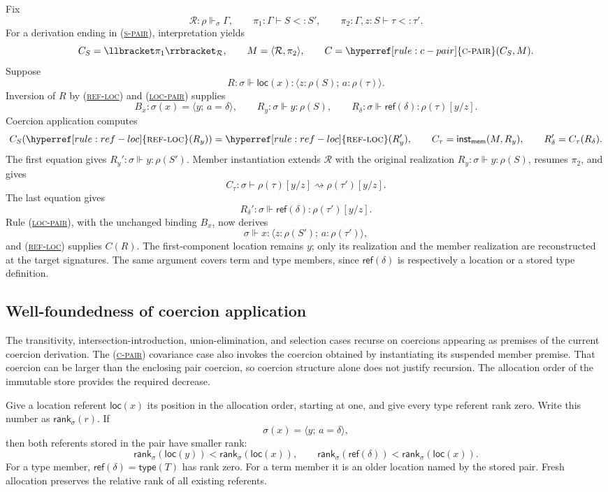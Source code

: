 \documentclass[acmsmall,screen,nonacm]{acmart}
\newcommand{\ruleuse}[1]{%
  \hyperref[rule:#1]{\textsc{#1}}}
\newcommand{\ruleref}[1]{%
  \textsc{(\hyperref[rule:#1]{#1})}}
\newcommand{\pairty}[4]{\langle #1\!:\!#2;\,#3\!:\!#4\rangle}
\newcommand{\pairval}[3]{\langle #1;\,#2=#3\rangle}
\newcommand{\subst}[3]{#1[#2/#3]}
\newcommand{\loc}[1]{\mathsf{loc}(#1)}
\newcommand{\typeref}[1]{\mathsf{type}(#1)}
\newcommand{\referentof}[1]{\mathsf{ref}(#1)}
\newcommand{\realizes}{\Vdash}
\newcommand{\coerce}{\mathrel{\rightsquigarrow}}
\newcommand{\compilepi}[2]{\llbracket #2\rrbracket_{#1}}
\newcommand{\action}[2]{#1(#2)}
\newcommand{\forcemem}[2]{\mathsf{inst}_{\mathsf{mem}}(#1,#2)}
\newcommand{\closure}[3]{\langle #1,#2\rangle}
\begin{document}
Fix
\[
  \mathcal R:\rho\realizes_\sigma\Gamma,
  \qquad
  \pi_1:\Gamma\vdash S<:S',
  \qquad
  \pi_2:\Gamma,z:S\vdash\tau<:\tau'.
\]
For a derivation ending in \ruleref{s-pair}, interpretation yields
\[
  C_S=\compilepi{\mathcal R}{\pi_1},
  \qquad
  M=\closure{\mathcal R}{\pi_2}{mem},
  \qquad
  C=\ruleuse{c-pair}(C_S,M).
\]
Suppose
\[
  R:\sigma\realizes\loc x:
    \pairty{z}{\rho(S)}{a}{\rho(\tau)}.
\]
Inversion of \(R\) by \ruleref{ref-loc} and \ruleref{loc-pair} supplies
\[
  B_x:\sigma(x)=\pairval{y}{a}{\delta},
  \qquad
  R_y:\sigma\realizes y:\rho(S),
  \qquad
  R_\delta:\sigma\realizes\referentof{\delta}:
    \subst{\rho(\tau)}{y}{z}.
\]
Coercion application computes
\[
  \action{C_S}{\ruleuse{ref-loc}(R_y)}=\ruleuse{ref-loc}(R_y'),
  \qquad
  C_\tau=\forcemem{M}{R_y},
  \qquad
  R_\delta'=\action{C_\tau}{R_\delta}.
\]
The first equation gives
\(R_y':\sigma\realizes y:\rho(S')\). Member instantiation extends
\(\mathcal R\) with the original realization
\(R_y:\sigma\realizes y:\rho(S)\), resumes \(\pi_2\), and gives
\[
  C_\tau:\sigma\vdash
  \subst{\rho(\tau)}{y}{z}\coerce
  \subst{\rho(\tau')}{y}{z}.
\]
The last equation gives
\[
  R_\delta':\sigma\realizes\referentof{\delta}:
    \subst{\rho(\tau')}{y}{z}.
\]
Rule \ruleref{loc-pair}, with the unchanged binding \(B_x\), now derives
\[
  \sigma\realizes x:
    \pairty{z}{\rho(S')}{a}{\rho(\tau')},
\]
and \ruleref{ref-loc} supplies \(\action{C}{R}\). The first-component
location remains \(y\); only its realization and the member realization are
reconstructed at the target signatures. The same argument covers term and
type members, since \(\referentof{\delta}\) is respectively a location or a
stored type definition.

\subsection{Well-foundedness of coercion application}
\label{sec:coercion-termination}

The transitivity, intersection-introduction, union-elimination, and selection
cases recurse on coercions appearing as premises of the current coercion derivation. The
\ruleref{c-pair} covariance case also invokes the coercion obtained by
instantiating its suspended member premise. That coercion can be larger than
the enclosing pair coercion, so coercion structure alone does not justify
recursion. The allocation order of the immutable store provides the required
decrease.

Give a location referent \(\loc{x}\) its position in the allocation order,
starting at one, and give every type referent rank zero. Write this number as
\(\mathsf{rank}_\sigma(r)\). If
\[
  \sigma(x)=\pairval{y}{a}{\delta},
\]
then both referents stored in the pair have smaller rank:
\[
  \mathsf{rank}_\sigma(\loc y)
    <\mathsf{rank}_\sigma(\loc x),
  \qquad
  \mathsf{rank}_\sigma(\referentof{\delta})
    <\mathsf{rank}_\sigma(\loc x).
\]
For a type member, \(\referentof{\delta}=\typeref{T}\) has rank zero. For a
term member it is an older location named by the stored pair.
Fresh allocation preserves the relative rank of all existing referents.
\end{document}
